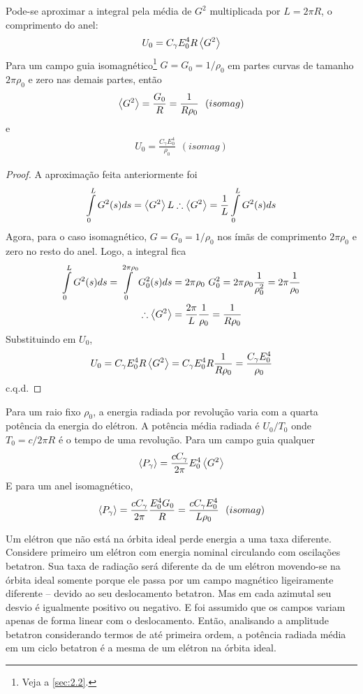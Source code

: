 Pode-se aproximar a integral pela média de $G^2$ multiplicada por $L=2\pi R$, o comprimento do anel:
\begin{align}
	U_0 = C_\gamma E_0^4 R \left< G^2 \right>
\end{align}
Para um campo guia isomagnético\footnote{Veja a \autoref{sec:2.2}.} $G = G_0=1/\rho_0$ em partes curvas de tamanho $2\pi\rho_0$ e zero nas demais partes, então
\begin{align}
	\left< G^2 \right> = \frac{G_0}{R} = \frac{1}{R \rho_0}\ \ (isomag)
\end{align}
e
\begin{align}
	U_0 = \frac{C_\gamma E_0^4}{\rho_0}\ \ (isomag)
\end{align}
\begin{proof}
	A aproximação feita anteriormente foi
	\begin{align*}
		\int\limits_{0}^{L}G^2(s)ds = \left< G^2 \right>L \therefore \left< G^2 \right> = \frac{1}{L}\int\limits_{0}^{L}G^2(s)ds
	\end{align*}
	Agora, para o caso isomagnético, $G=G_0=1/\rho_0$ nos ímãs de comprimento $2\pi \rho_0$ e zero no resto do anel. Logo, a integral fica
	\begin{align*}
		\int\limits_{0}^{L}G^2(s)ds = \int\limits_{0}^{2\pi\rho_0}G_0^2(s)ds &= 2\pi\rho_0\ G_0^2 = 2\pi\rho_0 \frac{1}{\rho_0^2} = 2\pi \frac{1}{\rho_0}\\
		\therefore \left< G^2 \right> &= \frac{2\pi}{L} \frac{1}{\rho_0} = \frac{1}{R \rho_0}
	\end{align*}
	Substituindo em $U_0$,
	\begin{align*}
		U_0 = C_\gamma E_0^4 R \left< G^2 \right> = C_\gamma E_0^4 R \frac{1}{R \rho_0} = \frac{C_\gamma E_0^4}{\rho_0}
	\end{align*}
	c.q.d.
\end{proof}

Para um raio fixo $\rho_0$, a energia radiada por revolução varia com a quarta potência da energia do elétron. A potência média radiada é $U_0/T_0$ onde $T_0 = c/2\pi R$ é o tempo de uma revolução. Para um campo guia qualquer
\begin{align}
	\left< P_\gamma \right> = \frac{c C_\gamma}{2\pi} E_0^4 \left< G^2 \right>
\end{align} 
E para um anel isomagnético,
\begin{align}
	\left< P_\gamma \right> = \frac{c C_\gamma}{2\pi}\frac{E_0^4 G_0}{R} = \frac{c C_\gamma E_0^4}{L \rho_0}\ \ (isomag)
\end{align}

Um elétron que não está na órbita ideal perde energia a uma taxa diferente. Considere primeiro um elétron com energia nominal circulando com oscilações betatron. Sua taxa de radiação será diferente da de um elétron movendo-se na órbita ideal somente porque ele passa por um campo magnético ligeiramente diferente -- devido ao seu deslocamento betatron. Mas em cada azimutal seu desvio é igualmente positivo ou negativo. E foi assumido que os campos variam apenas de forma linear com o deslocamento. Então, analisando a amplitude betatron considerando termos de até primeira ordem, a potência radiada média em um ciclo betatron é a mesma de um elétron na órbita ideal.

